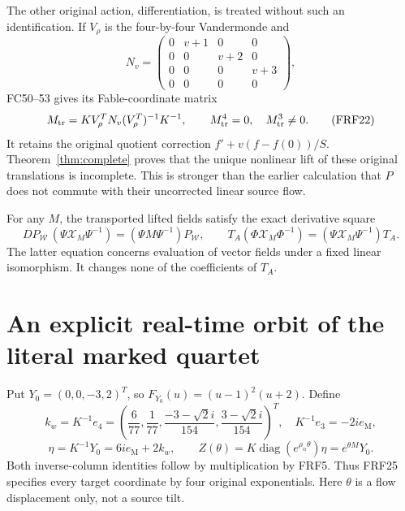 \documentclass[11pt]{article}
\newcommand{\diag}{\operatorname{diag}}
\begin{document}
The other original action, differentiation, is treated without such an
identification. If $V_\rho$ is the four-by-four Vandermonde and
\[
 N_v=\begin{pmatrix}0&v+1&0&0\\0&0&v+2&0\\0&0&0&v+3\\0&0&0&0\end{pmatrix},
\]
FC50--53 gives its Fable-coordinate matrix
\[
 M_{\rm tr}=K V_\rho^T N_v(V_\rho^T)^{-1}K^{-1},\qquad
 M_{\rm tr}^4=0,\quad M_{\rm tr}^3\ne0.\tag{FRF22}
\]
It retains the original quotient correction
$f' +v(f-f(0))/S$. Theorem~\ref{thm:complete} proves that the unique
nonlinear lift of these original translations is incomplete. This is
stronger than the earlier calculation that $P$ does not commute with
their uncorrected linear source flow.

For any $M$, the transported lifted fields satisfy the exact derivative
square
\[
 D P_{\mathcal W}\,(\Psi\mathcal X_M\Psi^{-1})
       =(\Psi M\Psi^{-1})P_{\mathcal W},\qquad
 T_A(\Phi\mathcal X_M\Phi^{-1})
       =(\Psi\mathcal X_M\Psi^{-1})T_A.\tag{FRF23}
\]
The latter equation concerns evaluation of vector fields under a fixed
linear isomorphism. It changes none of the coefficients of $T_A$.

\section{An explicit real-time orbit of the literal marked quartet}
Put $Y_0=(0,0,-3,2)^T$, so $F_{Y_0}(u)=(u-1)^2(u+2)$. Define
\[
 k_w=K^{-1}e_4=
 \left(\frac6{77},\frac1{77},\frac{-3-\sqrt2i}{154},
                         \frac{3-\sqrt2i}{154}\right)^T,\quad
 K^{-1}e_3=-2ie_{\mathrm M},\tag{FRF24}
\]
\[
 \eta=K^{-1}Y_0=6ie_{\mathrm M}+2k_w,\qquad
 Z(\theta)=K\diag(e^{\rho_\alpha\theta})\eta=e^{\theta M}Y_0.
 \tag{FRF25}
\]
Both inverse-column identities follow by multiplication by FRF5. Thus
FRF25 specifies every target coordinate by four original exponentials.
Here $\theta$ is a flow displacement only, not a source tilt.
\end{document}
